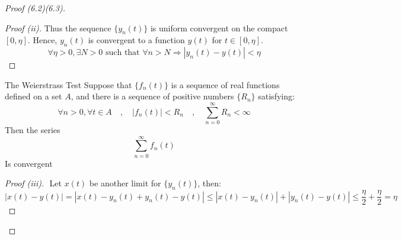 \begin{proof}[Proof (6.2)(6.3)]
\begin{proof}[Proof (ii)]
        Thus the sequence $\{y_n(t)\}$ is uniform convergent on the compact $[0, \eta]$.
        Hence, $y_n(t)$ is convergent to a function $y(t)$ for $t \in [0, \eta]$.
        \[
            \forall \eta >0 , \exists N>0 \text{ such that } \forall n>N \Longrightarrow |y_n(t) - y(t)| < \eta
        \]
    \end{proof}
    \begin{enrichment*}{The Weierstrass Test}
        Suppose that $\{f_n(t)\}$ is a sequence of real functions defined on a set $A$, 
        and there is a sequence of positive numbers $\{R_n\}$ satisfying:
        \[
            \forall n > 0 , \forall t \in A \quad,\quad |f_n(t)|<R_n \quad,\quad \sum_{n=0}^{\infty} R_n < \infty
        \]
        Then the series
        \[
            \sum_{n=0}^{\infty} f_n(t)
        \]
        Is convergent
    \end{enrichment*}
    \begin{proof}[Proof (iii)]
        $ $\newline 
        Let $x(t)$ be another limit for $\{y_n(t)\}$, then:
        \[
            |x(t)-y(t)| = |x(t)-y_n(t)+y_n(t)-y(t)| \leq |x(t)-y_n(t)|+|y_n(t)-y(t)| \leq \frac{\eta}{2}+\frac{\eta}{2} = \eta
        \]
    \end{proof}
\end{proof}
\newpage
